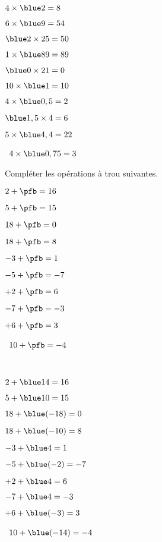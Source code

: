 \begin{colonne*exercice}
\begin{corrige}
   \ \\ [-5mm]
   \begin{colenumerate}{2}
      \item $4\times{\blue 2} =8$
      \item $6\times{\blue 9} =54$
      \item ${\blue 2}\times25 =50$
      \item $1\times{\blue 89} =89$
      \item ${\blue 0}\times21=0$
      \item $10\times{\blue 1} =10$
      \item $4\times{\blue 0,5} =2$
      \item ${\blue 1,5}\times4 =6$
      \item $5\times{\blue 4,4} =22$
      \item \, $4\times{\blue 0,75} =3$
   \end{colenumerate}
\end{corrige}

\bigskip


\begin{exercice} %
   Compléter les opérations à trou suivantes. \smallskip
   \begin{colenumerate}{2}
      \item $2+\pfb =16$ \hfill \smallskip
      \item $5+\pfb =15$ \hfill \smallskip
      \item $18+\pfb =0$ \hfill \smallskip
      \item $18+\pfb =8$ \hfill \smallskip
      \item $-3+\pfb =1$ \hfill \smallskip
      \item $-5+\pfb =-7$ \hfill
      \item $+2+\pfb =6$ \hfill
      \item $-7+\pfb =-3$ \hfill
      \item $+6+\pfb =3$ \hfill
      \item \, $10+\pfb =-4$ \hfill
   \end{colenumerate}
\end{exercice}

\begin{corrige}
   \ \\ [-5mm]
   \begin{colenumerate}{2}
      \item $2+{\blue 14} =16$
      \item $5+{\blue 10} =15$
      \item $18+{\blue (-18)} =0$
      \item $18+{\blue (-10)} =8$
      \item $-3+{\blue 4} =1$
      \item $-5+{\blue (-2)} =-7$
      \item $+2+{\blue 4} =6$
      \item $-7+{\blue 4} =-3$
      \item $+6+{\blue (-3)} =3$
      \item \, $10+{\blue (-14)} =-4$
   \end{colenumerate}
\end{corrige}


\end{colonne*exercice}
